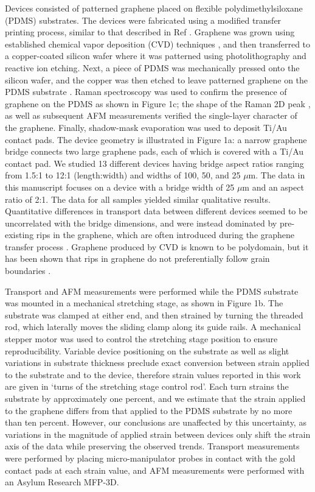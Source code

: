 \documentclass[edeposit,fullpage,draftthesis]{uiucthesis2009}
\begin{document}
    Devices consisted of patterned graphene placed on flexible polydimethylsiloxane (PDMS) substrates. The devices were fabricated using a modified transfer printing process, similar to that described in Ref \cite{Kim2009}. Graphene was grown using established chemical vapor deposition (CVD) techniques \cite{Li2009}, and then transferred to a copper-coated silicon wafer where it was patterned using photolithography and reactive ion etching. Next, a piece of PDMS was mechanically pressed onto the silicon wafer, and the copper was then etched to leave patterned graphene on the PDMS substrate \cite{Lee2010}. Raman spectroscopy was used to confirm the presence of graphene on the PDMS as shown in Figure 1c; the shape of the Raman 2D peak \cite{Ferrari2006}, as well as subsequent AFM measurements verified the single-layer character of the graphene. Finally, shadow-mask evaporation was used to deposit Ti/Au contact pads. The device geometry is illustrated in Figure 1a: a narrow graphene bridge connects two large graphene pads, each of which is covered with a Ti/Au contact pad. We studied 13 different devices having bridge aspect ratios ranging from 1.5:1 to 12:1 (length:width) and widths of 100, 50, and 25 $\mu$m. The data in this manuscript focuses on a device with a bridge width of 25 $\mu$m and an aspect ratio of 2:1. The data for all samples yielded similar qualitative results. Quantitative differences in transport data between different devices seemed to be uncorrelated with the bridge dimensions, and were instead dominated by pre-existing rips in the graphene, which are often introduced during the graphene transfer process \cite{Kim2012}. Graphene produced by CVD is known to be polydomain, but it has been shown that rips in graphene do not preferentially follow grain boundaries \cite{Kim2012}.
    
    Transport and AFM measurements were performed while the PDMS substrate was mounted in a mechanical stretching stage, as shown in Figure 1b. The substrate was clamped at either end, and then strained by turning the threaded rod, which laterally moves the sliding clamp along its guide rails. A mechanical stepper motor was used to control the stretching stage position to ensure reproducibility. Variable device positioning on the substrate as well as slight variations in substrate thickness preclude exact conversion between strain applied to the substrate and to the device, therefore strain values reported in this work are given in `turns of the stretching stage control rod'. Each turn strains the substrate by approximately one percent, and we estimate that the strain applied to the graphene differs from that applied to the PDMS substrate by no more than ten percent. However, our conclusions are unaffected by this uncertainty, as variations in the magnitude of applied strain between devices only shift the strain axis of the data while preserving the observed trends. Transport measurements were performed by placing micro-manipulator probes in contact with the gold contact pads at each strain value, and AFM measurements were performed with an Asylum Research MFP-3D.
    
\end{document}
